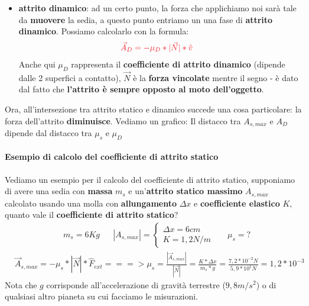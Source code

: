 \begin{itemize}
                \item \textbf{attrito dinamico}: ad un certo punto, la forza che applichiamo noi sarà tale da \textbf{muovere} la sedia, a questo punto entriamo un una fase di \textbf{attrito dinamico}. Possiamo calcolarlo con la formula:
                \begin{align*}
                    &\textcolor{Red}{\vec{A}_D = -\mu_D*|\vec{N}|*\hat{v}}
                \end{align*}
                Anche qui $\mu_D$ rappresenta il \textbf{coefficiente di attrito dinamico} (dipende dalle 2 superfici a contatto), $\vec{N}$ è la \textbf{forza vincolate} mentre il segno - è dato dal fatto che \textbf{l'attrito è sempre opposto al moto dell'oggetto}.
            \end{itemize}

            Ora, all'intersezione tra attrito statico e dinamico succede una cosa particolare: la forza dell'attrito \textbf{diminuisce}. Vediamo un grafico:
            Il distacco tra $A_{s, max}$ e $A_D$ dipende dal distacco tra $\mu_s$ e $\mu_D$

            \paragraph{Esempio di calcolo del coefficiente di attrito statico}
                Vediamo un esempio per il calcolo del coefficiente di attrito statico, supponiamo di avere una sedia con \textbf{massa} $m_s$ e un'\textbf{attrito statico massimo} $A_{s,max}$ calcolato usando una molla con \textbf{allungamento} $\Delta x$ e \textbf{coefficiente elastico} $K$, quanto vale il \textbf{coefficiente di attrito statico}?
                \begin{align*}
                    &m_s=6Kg && |A_{s, max}|=
                    \begin{cases}
                        \Delta x = 6 cm\\
                        K = 1,2 N/m
                    \end{cases}
                    &&\mu_s = ?
                \end{align*}
                \begin{align*}
                    &\vec{A}_{s,max} = -\mu_s * |\vec{N}| * \hat{F}_{ext} ===> \mu_s = \frac{|\vec{A}_{s, max}|}{|\vec{N}|} = \frac{K*\Delta x}{m_s * g} = \frac{7,2*10^{-2}N}{5,9*10^1N}=1,2*10^{-3}
                \end{align*}
                Nota che $g$ corrisponde all'accelerazione di gravità terrestre ($9,8 m/s^2$) o di qualsiasi altro pianeta su cui facciamo le misurazioni.

